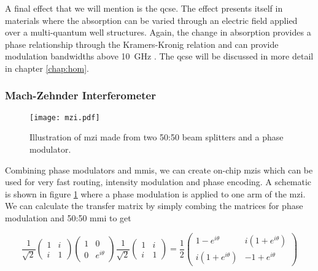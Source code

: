 A final effect that we will mention is the \ac{qcse}. The effect presents itself in materials where the absorption can be varied through an electric field applied over a multi-quantum well structures. Again, the change in absorption provides a phase relationship through the Kramers-Kronig relation and can provide modulation bandwidths above \SI{10}{GHz} \cite{Sibson2017InP, semenenko2019integrated, semenenko2019mdi, semenenko2019, smit2014}. The \ac{qcse} will be discussed in more detail in chapter \ref{chap:hom}.

\subsubsection*{Mach-Zehnder Interferometer}

\begin{figure}[t]
	\centering
	\texttt{[image: mzi.pdf]}
	\caption[Mach-Zehnder interferometer schematic]{Illustration of \acs{mzi} made from two 50:50 beam splitters and a phase modulator.}
	\label{fig:mzi}
\end{figure}

Combining phase modulators and \acp{mmi}, we can create on-chip \acp{mzi} which can be used for very fast routing, intensity modulation and phase encoding. A schematic is shown in figure \ref{fig:mzi} where a phase modulation is applied to one arm of the \ac{mzi}.  We can calculate the transfer matrix by simply combing the matrices for phase modulation and {50:50} \ac{mmi} to get

\begin{equation}
	\frac{1}{\sqrt{2}}\left(
	\begin{matrix}
	1 & i\\
	i & 1
	\end{matrix}
	\right)
	\left(
	\begin{matrix}
	1 & 0\\
	0 & e^{i\theta}
	\end{matrix}
	\right)
	\frac{1}{\sqrt{2}}\left(
	\begin{matrix}
	1 & i\\
	i & 1
	\end{matrix}
	\right)=
	\frac{1}{2}\left(
	\begin{matrix}
	1 - e^{i\theta} & i(1 +  e^{i\theta})\\
	i(1 +  e^{i\theta}) & -1 +  e^{i\theta}
	\end{matrix}
	\right)
\end{equation}

